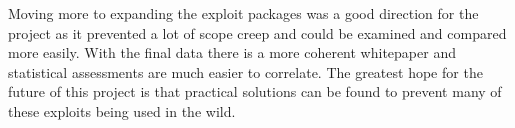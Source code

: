 \documentclass[IEEEtran,letterpaper,10pt,notitlepage,draftclsnofoot,onecolumn]{article}
\begin{document}
Moving more to expanding the exploit packages was a good direction for the project as it prevented a lot of scope creep and could be examined and compared more easily.
With the final data there is a more coherent whitepaper and statistical assessments are much easier to correlate.
The greatest hope for the future of this project is that practical solutions can be found to prevent many of these exploits being used in the wild.



\end{document}
